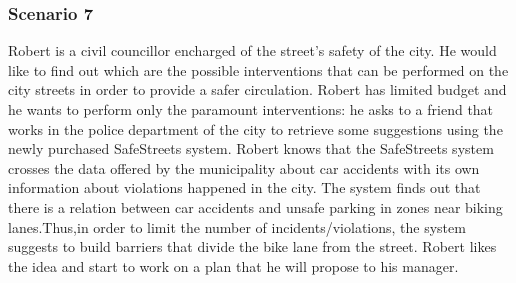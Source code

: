 \subsubsection{Scenario 7}
Robert is a civil councillor encharged of the street's safety of the city. He would like to find out which are the possible interventions that can be performed on the city streets in order to provide a safer circulation. Robert has limited budget  and he wants to perform only the paramount interventions: he asks to a friend that works in the police department of the city to retrieve some suggestions using the newly purchased SafeStreets system. Robert knows that the SafeStreets system crosses the data offered by the municipality about car accidents with its own information about violations happened in the city. The system finds out that there is a relation between car accidents and unsafe parking in zones near biking lanes.Thus,in order to limit the number of incidents/violations, the system suggests to build barriers that divide the bike lane from the street. Robert likes the idea and start to work on a plan that he will propose to his manager.
